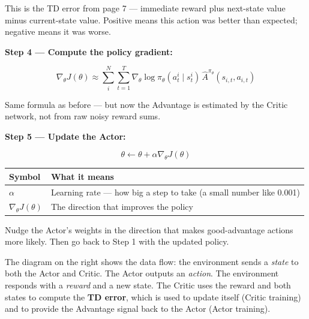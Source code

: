 This is the TD error from page 7 --- immediate reward plus next-state value minus current-state value. Positive means this action was better than expected; negative means it was worse.

\medskip

\textbf{Step 4 --- Compute the policy gradient:}

\[
\nabla_\theta J(\theta) \approx \sum_i^N \sum_{t=1}^T \nabla_\theta \log\pi_\theta(a_t^i \mid s_t^i)\, \hat{A}^{\pi_\theta}(s_{i,t}, a_{i,t})
\]

Same formula as before --- but now the Advantage is estimated by the Critic network, not from raw noisy reward sums.

\medskip

\textbf{Step 5 --- Update the Actor:}

\[
\theta \leftarrow \theta + \alpha \nabla_\theta J(\theta)
\]

\begin{center}
\begin{tabular}{ll}
\hline
Symbol & What it means \\
\hline
$\alpha$               & Learning rate --- how big a step to take (a small number like 0.001) \\
$\nabla_\theta J(\theta)$ & The direction that improves the policy \\
\hline
\end{tabular}
\end{center}

Nudge the Actor's weights in the direction that makes good-advantage actions more likely. Then go back to Step 1 with the updated policy.

\medskip

The diagram on the right shows the data flow: the environment sends a \textit{state} to both the Actor and Critic. The Actor outputs an \textit{action}. The environment responds with a \textit{reward} and a new state. The Critic uses the reward and both states to compute the \textbf{TD error}, which is used to update itself (Critic training) and to provide the Advantage signal back to the Actor (Actor training).